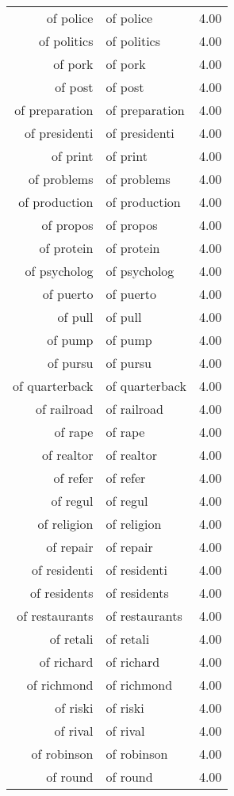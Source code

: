 \begin{table}[ht]
\begin{tabular}{rlr}
  of police & of police & 4.00 \\ 
  of politics & of politics & 4.00 \\ 
  of pork & of pork & 4.00 \\ 
  of post & of post & 4.00 \\ 
  of preparation & of preparation & 4.00 \\ 
  of presidenti & of presidenti & 4.00 \\ 
  of print & of print & 4.00 \\ 
  of problems & of problems & 4.00 \\ 
  of production & of production & 4.00 \\ 
  of propos & of propos & 4.00 \\ 
  of protein & of protein & 4.00 \\ 
  of psycholog & of psycholog & 4.00 \\ 
  of puerto & of puerto & 4.00 \\ 
  of pull & of pull & 4.00 \\ 
  of pump & of pump & 4.00 \\ 
  of pursu & of pursu & 4.00 \\ 
  of quarterback & of quarterback & 4.00 \\ 
  of railroad & of railroad & 4.00 \\ 
  of rape & of rape & 4.00 \\ 
  of realtor & of realtor & 4.00 \\ 
  of refer & of refer & 4.00 \\ 
  of regul & of regul & 4.00 \\ 
  of religion & of religion & 4.00 \\ 
  of repair & of repair & 4.00 \\ 
  of residenti & of residenti & 4.00 \\ 
  of residents & of residents & 4.00 \\ 
  of restaurants & of restaurants & 4.00 \\ 
  of retali & of retali & 4.00 \\ 
  of richard & of richard & 4.00 \\ 
  of richmond & of richmond & 4.00 \\ 
  of riski & of riski & 4.00 \\ 
  of rival & of rival & 4.00 \\ 
  of robinson & of robinson & 4.00 \\ 
  of round & of round & 4.00 \\ 

\end{tabular}
\end{table}
